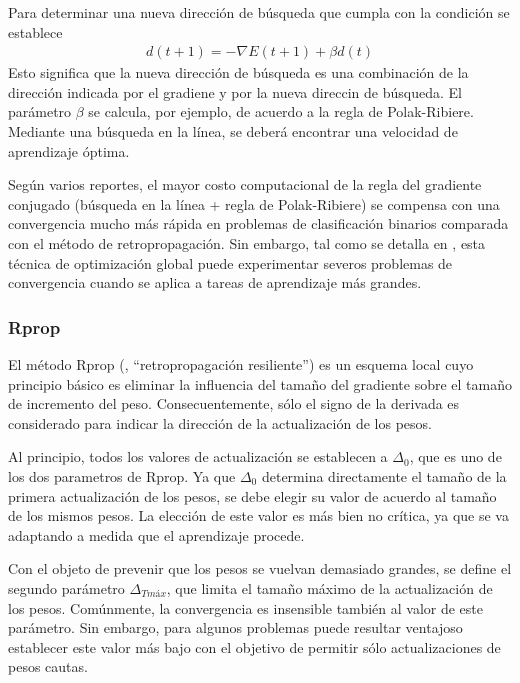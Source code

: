 Para determinar una nueva dirección de búsqueda que cumpla con la
condición  se establece
%
\begin{align}
  d(t+1) = -\nabla{}E(t+1)+\beta d(t)
\end{align}
%
Esto significa que la nueva dirección de búsqueda es una combinación
de la dirección indicada por el gradiene y por la nueva direccin de
búsqueda. El parámetro $\beta$ se calcula, por ejemplo, de acuerdo a
la regla de Polak-Ribiere. Mediante una búsqueda en la línea, se
deberá encontrar una velocidad de aprendizaje óptima.

Según varios reportes, el mayor costo computacional de la regla del
gradiente conjugado (búsqueda en la línea + regla de Polak-Ribiere) se
compensa con una convergencia mucho más rápida en problemas de
clasificación binarios comparada con el método de
retropropagación. Sin embargo, tal como se detalla en
\cite{schiffmann}, esta técnica de optimización global puede
experimentar severos problemas de convergencia cuando se aplica a
tareas de aprendizaje más grandes.
%
\subsubsection{Rprop}
%
El método Rprop (, ``retropropagación
resiliente'') \cite{rprop} es un esquema local cuyo principio básico
es eliminar la influencia del tamaño del gradiente sobre el
tamaño de incremento del peso. Consecuentemente, sólo el signo de la
derivada es considerado para indicar la dirección de la actualización
de los pesos.

Al principio, todos los valores de actualización se establecen a
$\Delta_0$, que es uno de los dos parametros de Rprop. Ya que
$\Delta_0$ determina directamente el tamaño de la primera
actualización de los pesos, se debe elegir su valor de acuerdo al
tamaño de los mismos pesos. La elección de este valor es más bien no
crítica, ya que se va adaptando a medida que el aprendizaje procede.

Con el objeto de prevenir que los pesos se vuelvan demasiado grandes,
se define el segundo parámetro $\Delta_{T{máx}}$, que limita el tamaño
máximo de la actualización de los pesos. Comúnmente, la convergencia
es insensible también al valor de este parámetro. Sin embargo, para
algunos problemas puede resultar ventajoso establecer este valor más bajo
con el objetivo de permitir sólo actualizaciones de pesos cautas.

